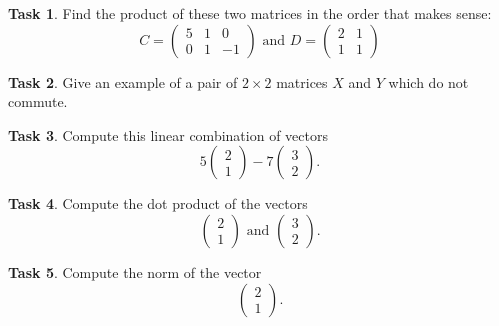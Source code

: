 \documentclass[11pt]{amsart}
\theoremstyle{definition}
\newtheorem{task}{Task}
\begin{document}
\begin{task} Find the product of these two matrices in the order that makes sense:
\begin{equation*}
C = \begin{pmatrix} 5 & 1 & 0 \\ 0 & 1 & -1 \end{pmatrix} \text{ and }
D = \begin{pmatrix} 2 & 1 \\ 1 & 1 \end{pmatrix}
\end{equation*}
\end{task}

\begin{task} Give an example of a pair of $2\times 2$ matrices $X$ and $Y$ which do not commute.
\end{task}

\begin{task} Compute this linear combination of vectors
\begin{equation*}
5 \begin{pmatrix} 2 \\ 1 \end{pmatrix} - 7 \begin{pmatrix} 3 \\ 2 \end{pmatrix}.
\end{equation*}
\end{task}

\begin{task} Compute the dot product of the vectors
\begin{equation*}
\begin{pmatrix} 2 \\ 1 \end{pmatrix} \text{ and } \begin{pmatrix} 3 \\ 2 \end{pmatrix}.
\end{equation*}
\end{task}

\begin{task} Compute the norm of the vector
\begin{equation*}
\begin{pmatrix} 2 \\ 1 \end{pmatrix}.
\end{equation*}
\end{task}
\end{document}
